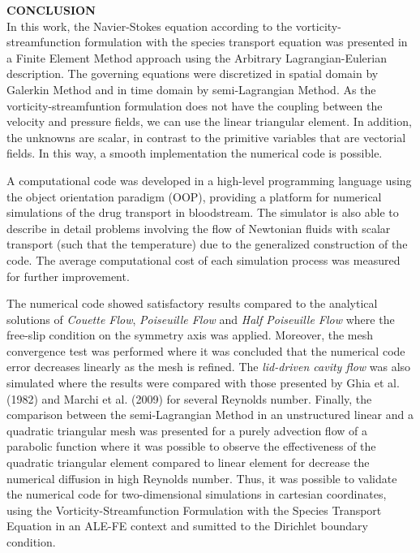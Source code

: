 \clearpage
\noindent\textbf{CONCLUSION}
$\!$\\

In this work, the Navier-Stokes equation according to the 
vorticity-streamfunction formulation with the species transport 
equation was presented in a Finite Element Method approach
using the Arbitrary Lagrangian-Eulerian description.
The governing equations were discretized in spatial domain by
Galerkin Method and in time domain by semi-Lagrangian Method. 
As the vorticity-streamfuntion formulation does not have the 
coupling between the velocity and pressure fields, we can use the 
linear triangular element. In addition, the unknowns are scalar,
in contrast to the primitive variables that are vectorial fields.
In this way, a smooth implementation 
the numerical code is possible.

\medskip
A computational code was developed in a high-level programming language 
using the object orientation paradigm (OOP), 
providing a platform for numerical
simulations of the drug transport in bloodstream. The simulator 
is also able to describe in detail problems involving the flow 
of Newtonian fluids with scalar transport 
(such that the temperature) due to the generalized 
construction of the code. The average computational cost of 
each simulation process was measured for further improvement.
 

\medskip
The numerical code showed satisfactory results compared to the 
analytical solutions of \textit{Couette Flow}, 
\textit{Poiseuille Flow} and \textit{Half Poiseuille Flow} 
where the free-slip condition on the symmetry axis was applied. 
Moreover, the mesh convergence test was performed where
it was concluded that the numerical code error decreases linearly
as the mesh is refined.
The \textit{lid-driven cavity flow} was also simulated where the 
results were compared with those presented by Ghia et al. (1982) 
\cite{ghia1982} and Marchi et al. (2009) \cite{marchi2009} 
for several Reynolds number. Finally, the comparison between the
semi-Lagrangian Method in an unstructured linear and a quadratic
triangular mesh was
presented for a purely advection flow of a parabolic function 
where it was possible to observe the effectiveness of the
quadratic triangular element compared to linear element
for decrease the numerical diffusion in high Reynolds number.
Thus, it was possible to validate the numerical code
for two-dimensional simulations in cartesian coordinates,
using the Vorticity-Streamfunction Formulation
with the Species Transport Equation in an ALE-FE context
and sumitted to the Dirichlet boundary condition.


